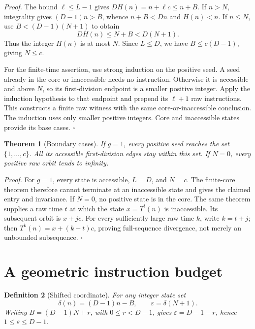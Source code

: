 \documentclass[11pt,letterpaper]{article}
\newtheorem{theorem}{Theorem}
\newtheorem{definition}[theorem]{Definition}
\newenvironment{proof}{\noindent\textit{Proof.}}{\hfill\(\square\)}
\begin{document}
\begin{proof}
The bound \(\ell\leq L-1\) gives
\(D H(n)=n+\ell c\leq n+B\). If \(n>N\), integrality gives
\((D-1)n>B\), whence \(n+B<Dn\) and \(H(n)<n\). If \(n\leq N\), use
\(B<(D-1)(N+1)\) to obtain
\[
 D H(n)\leq N+B<D(N+1).
\]
Thus the integer \(H(n)\) is at most \(N\). Since \(L\leq D\), we have
\(B\leq c(D-1)\), giving \(N\leq c\).

For the finite-time assertion, use strong induction on the positive seed.
A seed already in the core or inaccessible needs no instruction. Otherwise
it is accessible and above \(N\), so its first-division endpoint is a
smaller positive integer. Apply the induction hypothesis to that endpoint
and prepend its \(\ell+1\) raw instructions. This constructs a finite raw
witness with the same core-or-inaccessible conclusion. The induction uses
only smaller positive integers. Core and inaccessible states provide its
base cases.
\end{proof}

\begin{theorem}[Boundary cases]
If \(g=1\), every positive seed reaches the set \(\{1,\ldots,c\}\).
All its accessible first-division edges stay within this set. If \(N=0\),
every positive raw orbit tends to infinity.
\end{theorem}

\begin{proof}
For \(g=1\), every state is accessible, \(L=D\), and \(N=c\).
The finite-core theorem therefore cannot terminate at an inaccessible state
and gives the claimed entry and invariance. If \(N=0\), no positive state
is in the core. The same theorem supplies a raw time \(t\) at which the
state \(x=T^t(n)\) is inaccessible. Its subsequent orbit is \(x+jc\).
For every sufficiently large raw time \(k\), write \(k=t+j\); then
\(T^k(n)=x+(k-t)c\), proving full-sequence divergence, not merely an
unbounded subsequence.
\end{proof}

\section{A geometric instruction budget}

\begin{definition}[Shifted coordinate]
For any integer state set
\[
 \delta(n)=(D-1)n-B,\qquad \varepsilon=\delta(N+1).
\]
Writing \(B=(D-1)N+r\), with \(0\leq r<D-1\), gives
\(\varepsilon=D-1-r\), hence \(1\leq\varepsilon\leq D-1\).
\end{definition}
\end{document}
